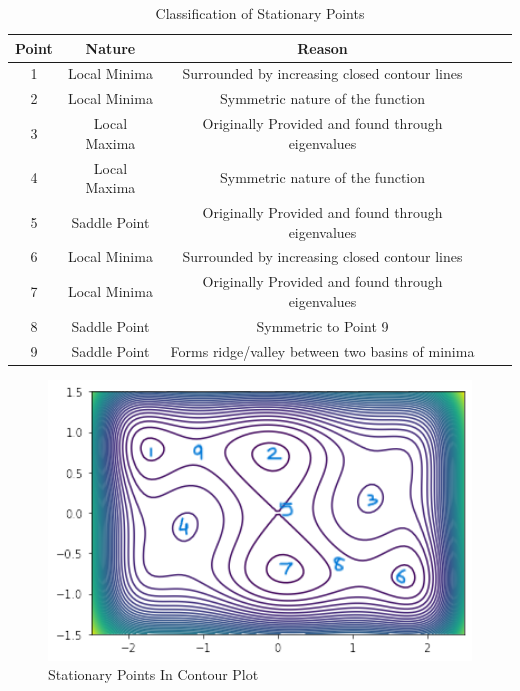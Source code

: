 \documentclass{article}
\begin{document}
\begin{table}[htbp]
\centering
\begin{tabular}{|c|c|c|c|l|}
\hline
\textbf{Point} &  \textbf{Nature} & \textbf{Reason} \\
\hline
1  & Local Minima  & Surrounded by increasing closed contour lines \\
\hline
2  & Local Minima  & Symmetric nature of the function \\
\hline
3  & Local Maxima & Originally Provided and found through eigenvalues\\
\hline
4 & Local Maxima  & Symmetric nature of the function \\
\hline
5  & Saddle Point  & Originally Provided and found through eigenvalues \\
\hline
6  & Local Minima  & Surrounded by increasing closed contour lines \\
\hline
7  & Local Minima &  Originally Provided and found through eigenvalues \\
\hline
8  & Saddle Point  & Symmetric to Point 9 \\
\hline
9  & Saddle Point  & Forms ridge/valley between two basins of minima \\
\hline
\end{tabular}
\caption{Classification of Stationary Points}
\label{tab:stationary-points}
\end{table}



\begin{figure}[h]
    \centering
    \includegraphics[width=1\textwidth]{lab1c}
    \caption{Stationary Points In Contour Plot}
    \label{lab1c}
\end{figure}
\end{document}
